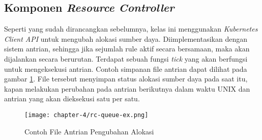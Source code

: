 \subsection{Komponen \textit{Resource Controller}}

Seperti yang sudah dirancangkan sebelumnya, kelas ini menggunakan \textit{Kubernetes Client API} untuk mengubah alokasi sumber daya. Diimplementasikan dengan sistem antrian, sehingga jika sejumlah rule aktif secara bersamaan, maka akan dijalankan secara berurutan. Terdapat sebuah fungsi \textit{tick} yang akan berfungsi untuk mengeksekusi antrian. Contoh simpanan file antrian dapat dilihat pada gambar \ref{fig:ex-queue-rc}. File tersebut menyimpan status alokasi sumber daya pada saat itu, kapan melakukan perubahan pada antrian berikutnya dalam waktu UNIX dan antrian yang akan dieksekusi satu per satu.

\begin{figure}[h]
    \centering
    \texttt{[image: chapter-4/rc-queue-ex.png]}
    \caption{Contoh File Antrian Pengubahan Alokasi}
    \label{fig:ex-queue-rc}
\end{figure}

